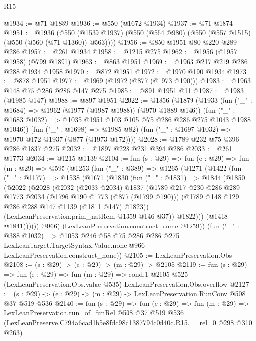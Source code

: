 \begin{lexlean}{R15}
\begin{coremodule}
@1934 := @71 @1889
@1936 := @550 (@1672 @1934)
@1937 := @71 @1874
@1951 := @1936
    (@550 (@1539 @1937) (@550 (@554 @980) (@550 (@557 @1515) (@550 (@560 (@71 @1360)) @563))))
@1956 := @850 @1951 @80 @220 @289 @286
@1957 := @261 @1934
@1958 := @1215 @275
@1962 := @1956 (@1957 @1958) (@799 @1891)
@1963 := @863 @1951
@1969 := @1963 @217 @219 @286 @288 @1934 @1958
@1970 := @872 @1951
@1972 := @1970 @190 @1934
@1973 := @878 @1951
@1977 := @1969 (@1972 (@877 (@1973 @190)))
@1983 := @1963 @148 @75 @286 @286 @147 @275
@1985 := @891 @1951 @11
@1987 := @1983 (@1985 @147)
@1988 := @897 @1951
@2022 := @1856
    (@1879
      (@1933
        (fun ("_" : @1684) => @1962 (@1977 (@1987 @1988)) (@970 @1889 @146))
        (fun ("_" : @1683 @1032) => @1035 @1951 @103 @105 @75 @286 @286 @275 @1043 @1988 @1046))
      (fun ("_" : @1698) => @1985 @82)
      (fun ("_" : @1697 @1032) => @1970 @172 @1937 (@877 (@1973 @172))))
@2028 := @1789 @232 @75 @396 @286 @1837 @275
@2032 := @1897 @228 @231 @394 @286
@2033 := @261 @1773
@2034 := @1215 @1139
@2104 := fun (s : @29) =>
  fun (e : @29) =>
  fun (m : @29) =>
  @595
    (@1253
      (fun ("_" : @389) =>
      @1265
        (@1271
          (@1422
            (fun ("_" : @1177) =>
            @1538
              (@1671
                (@1830
                  (fun ("_" : @1831) =>
                  @1844
                    (@1850
                      (@2022
                        (@2028
                          (@2032
                            (@2033 @2034)
                            @1837
                            (@1789
                              @217
                              @230
                              @286
                              @289
                              @1773
                              @2034
                              (@1796 @190 @1773 (@877 (@1799 @190)))
                              (@1789 @148 @129 @286 @288 @147 @1139 (@1811 @147) @1823))
                            (LexLeanPreservation.prim_natRem @1359 @146 @37))
                          @1822)))
                    (@1418 @1841))))))
          @966)
        (LexLeanPreservation.construct_some @1259))
      (fun ("_" : @388 @1032) =>
      @1053
        @246
        @58
        @75
        @286
        @286
        @275
        LexLeanTarget.TargetSyntax.Value.none
        @966
        LexLeanPreservation.construct_none))
@2105 := LexLeanPreservation.Obs
@2108 := (s : @29) -> (e : @29) -> (m : @29) -> @2105
@2119 := fun (s : @29) =>
  fun (e : @29) =>
  fun (m : @29) =>
  cond.{1} @2105 @525 (LexLeanPreservation.Obs.value @535) LexLeanPreservation.Obs.overflow
@2127 := (s : @29) -> (e : @29) -> (m : @29) -> LexLeanPreservation.RunConv @508 @37 @519 @536
@2140 := fun (s : @29) =>
  fun (e : @29) =>
  fun (m : @29) =>
  LexLeanPreservation.run_of_funRel
    @508
    @37
    @519
    @536
    (LexLeanPreserve.C794a6cad1b5e8fdc98d1387794c0d40c.R15.__rel_0 @298 @310 @263)
\end{coremodule}
\end{lexlean}
